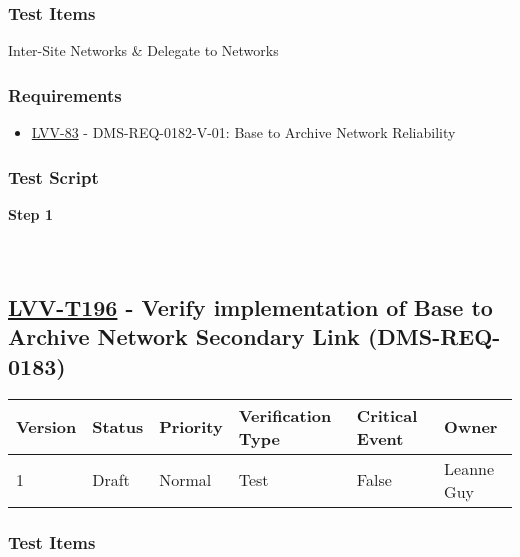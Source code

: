 \hypertarget{test-items-171}{%
\subsubsection{Test Items}\label{test-items-171}}

Inter-Site Networks \& Delegate to Networks

\hypertarget{requirements-172}{%
\subsubsection{Requirements}\label{requirements-172}}

\begin{itemize}
\tightlist
\item
  \href{https://jira.lsstcorp.org/browse/LVV-83}{LVV-83} -
  DMS-REQ-0182-V-01: Base to Archive Network Reliability
\end{itemize}

\hypertarget{test-script-172}{%
\subsubsection{Test Script}\label{test-script-172}}

\textbf{Step 1}\\
~\\
~\\

\hypertarget{lvv-t196---verify-implementation-of-base-to-archive-network-secondary-link-dms-req-0183}{%
\subsection{\texorpdfstring{\href{https://jira.lsstcorp.org/secure/Tests.jspa\#/testCase/LVV-T196}{LVV-T196}
- Verify implementation of Base to Archive Network Secondary Link
(DMS-REQ-0183)}{LVV-T196 - Verify implementation of Base to Archive Network Secondary Link (DMS-REQ-0183)}}\label{lvv-t196---verify-implementation-of-base-to-archive-network-secondary-link-dms-req-0183}}

\begin{longtable}[]{@{}llllll@{}}
\toprule
Version & Status & Priority & Verification Type & Critical Event &
Owner\tabularnewline
\midrule
\endhead
1 & Draft & Normal & Test & False & Leanne Guy\tabularnewline
\bottomrule
\end{longtable}

\hypertarget{test-items-172}{%
\subsubsection{Test Items}\label{test-items-172}}

